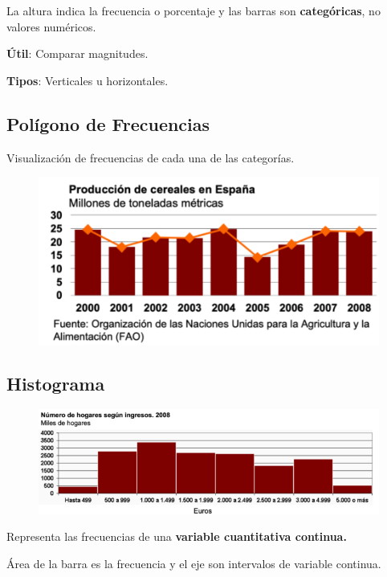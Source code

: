 \documentclass[12pt, twoside, openright]{report} %
\begin{document}
La altura indica la frecuencia o porcentaje y las barras son
\textbf{categóricas}, no valores numéricos.

\textbf{Útil}: Comparar magnitudes.

\textbf{Tipos}: Verticales u horizontales.

\subsection{Polígono de
Frecuencias}

Visualización de frecuencias de cada una de las categorías.
\begin{figure}[H]
	{\includegraphics[scale=.5]{Untitled 6.png}}
\end{figure}

\subsection{Histograma}

\begin{figure}[H]
	{\includegraphics[scale=.4]{Untitled 7.png}}
\end{figure}
Representa las frecuencias de una \textbf{variable cuantitativa
continua.}

Área de la barra es la frecuencia y el eje son intervalos de variable
continua.
\end{document}
